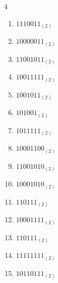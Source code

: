 \begin{multicols}{4}
\begin{enumerate}
        \phantom{$=86$}

  \item $1110011_{(2)}$

        \phantom{$=115$}

\columnbreak %

  \item $10000011_{(2)}$

        \phantom{$=131$}

  \item $11001011_{(2)}$

        \phantom{$=203$}

  \item $10011111_{(2)}$

        \phantom{$=159$}

  \item $1001011_{(2)}$

        \phantom{$=75$}

  \item $101001_{(2)}$

        \phantom{$=41$}

  \item $1011111_{(2)}$

        \phantom{$=95$}

  \item $10001100_{(2)}$

        \phantom{$=140$}

  \item $11001010_{(2)}$

        \phantom{$=202$}

  \item $10001010_{(2)}$

        \phantom{$=138$}

  \item $110111_{(2)}$

        \phantom{$=55$}

  \item $10001111_{(2)}$

        \phantom{$=143$}

  \item $110111_{(2)}$

        \phantom{$=55$}

  \item $11111111_{(2)}$

        \phantom{$=255$}

  \item $10110111_{(2)}$


\end{enumerate}
\end{multicols}
